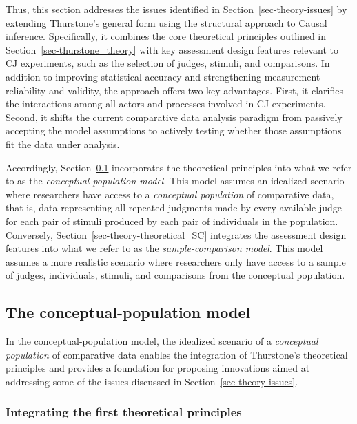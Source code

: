 \documentclass[
  authoryear,
  review,
  1p]{elsarticle}
\begin{document}
Thus, this section addresses the issues identified in
Section~\ref{sec-theory-issues} by extending Thurstone's general form
using the structural approach to Causal inference. Specifically, it
combines the core theoretical principles outlined in
Section~\ref{sec-thurstone_theory} with key assessment design features
relevant to CJ experiments, such as the selection of judges, stimuli,
and comparisons. In addition to improving statistical accuracy and
strengthening measurement reliability and validity, the approach offers
two key advantages. First, it clarifies the interactions among all
actors and processes involved in CJ experiments. Second, it shifts the
current comparative data analysis paradigm from passively accepting the
model assumptions to actively testing whether those assumptions fit the
data under analysis.

Accordingly, Section~\ref{sec-theory-theoretical_P} incorporates the
theoretical principles into what we refer to as the
\emph{conceptual-population model}. This model assumes an idealized
scenario where researchers have access to a \emph{conceptual population}
of comparative data, that is, data representing all repeated judgments
made by every available judge for each pair of stimuli produced by each
pair of individuals in the population. Conversely,
Section~\ref{sec-theory-theoretical_SC} integrates the assessment design
features into what we refer to as the \emph{sample-comparison model}.
This model assumes a more realistic scenario where researchers only have
access to a sample of judges, individuals, stimuli, and comparisons from
the conceptual population.

\subsection{The conceptual-population
model}\label{sec-theory-theoretical_P}

In the conceptual-population model, the idealized scenario of a
\emph{conceptual population} of comparative data enables the integration
of Thurstone's theoretical principles and provides a foundation for
proposing innovations aimed at addressing some of the issues discussed
in Section~\ref{sec-theory-issues}.

\subsubsection{Integrating the first theoretical
principles}\label{sec-theory-theoretical_P1}
\end{document}
